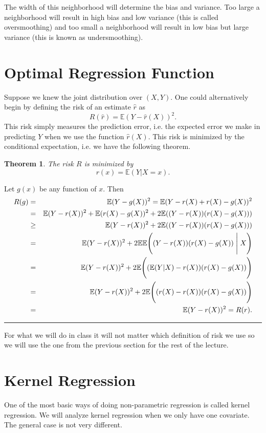 \documentclass[twoside,12pt]{article}
\newcounter{lecnum}
\newtheorem{theorem}{Theorem}[lecnum]
\newenvironment{proof}{{\bf Proof:}}{\hfill\rule{2mm}{2mm}}
\begin{document}
The width of this neighborhood will determine the bias and variance. Too large
a neighborhood will result in high bias and low variance (this is called oversmoothing)
and too small a neighborhood will result in low bias but large variance (this is known 
as undersmoothing).

\section{Optimal Regression Function}
Suppose we knew the joint distribution over $(X,Y)$. 
One could alternatively begin by defining the risk of an estimate $\widehat{r}$ as 
$$
R(\widehat{r})= \mathbb{E}(Y-\widehat{r}(X))^2.
$$
This risk simply measures the prediction error, i.e. the expected error we make in predicting $Y$ when we use the function $\widehat{r}(X)$.
This risk is minimized by the conditional expectation, i.e. we have the following theorem. 
\begin{theorem}
The risk $R$ is minimized by
$$
r(x) = \mathbb{E}(Y|X=x).
$$
\end{theorem}

\begin{proof}
Let $g(x)$ be any function of $x$.
Then
\begin{eqnarray*}
R(g) &=& \mathbb{E}(Y-g(X))^2 = \mathbb{E}(Y-r(X)+r(X)-g(X))^2\\
&=& \mathbb{E}(Y-r(X))^2 + \mathbb{E}(r(X)-g(X))^2 + 2   \mathbb{E}((Y-r(X)) (r(X)-g(X)))\\
&\geq &
\mathbb{E}(Y-r(X))^2 + 2   \mathbb{E}((Y-r(X)) (r(X)-g(X)))\\
&=& \mathbb{E}(Y-r(X))^2 + 2   \mathbb{E} \mathbb{E} \Biggl( (Y-r(X)) (r(X)-g(X))\Biggm| X\Biggr)\\
&=& \mathbb{E}(Y-r(X))^2 + 2   \mathbb{E}  \Biggl( ( \mathbb{E}(Y|X)-r(X)) (r(X)-g(X))\Biggr)\\
&=& \mathbb{E}(Y-r(X))^2 + 2   \mathbb{E}  \Biggl( ( r(X)-r(X)) (r(X)-g(X))\Biggr)\\
&=& \mathbb{E}(Y-r(X))^2 = R(r).
\end{eqnarray*}
\end{proof}

For what we will do in class it will not matter which definition of risk we use so we will use the one from the previous section for the rest of the lecture.

\section{Kernel Regression}
One of the most basic ways of doing non-parametric regression is called kernel regression.
We will analyze kernel regression when we only have one covariate. The general case is not 
very different.
\end{document}
